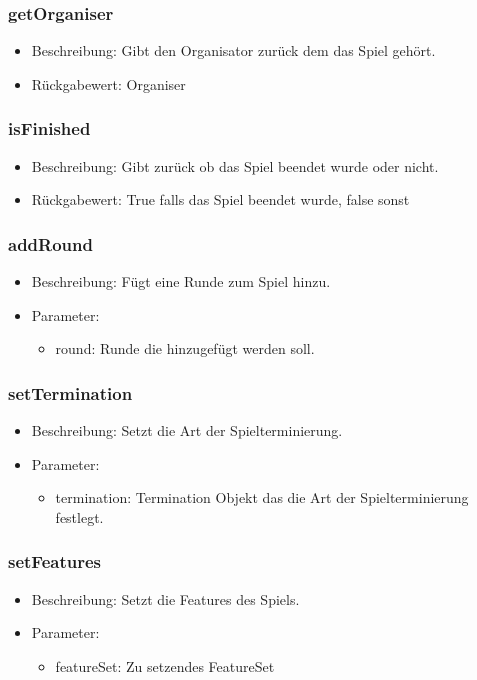 \documentclass[a4paper]{scrreprt}
\begin{document}
	\subsubsection{getOrganiser}
	\begin{itemize}
		\item Beschreibung: Gibt den Organisator zurück dem das Spiel gehört.
		\item Rückgabewert: Organiser
	\end{itemize}

	\subsubsection{isFinished}
	\begin{itemize}
		\item Beschreibung: Gibt zurück ob das Spiel beendet wurde oder nicht.
		\item Rückgabewert: True falls das Spiel beendet wurde, false sonst
	\end{itemize}

	\subsubsection{addRound}
	\begin{itemize}
		\item Beschreibung: Fügt eine Runde zum Spiel hinzu.
		\item Parameter:
		\begin{itemize}
			\item round: Runde die hinzugefügt werden soll.
		\end{itemize}
	\end{itemize}

	\subsubsection{setTermination}
	\begin{itemize}
		\item Beschreibung: Setzt die Art der Spielterminierung.
		\item Parameter:
		\begin{itemize}
			\item termination: Termination Objekt das die Art der Spielterminierung festlegt.
		\end{itemize}
	\end{itemize}

	\subsubsection{setFeatures}
	\begin{itemize}
		\item Beschreibung: Setzt die Features des Spiels.
		\item Parameter:
		\begin{itemize}
			\item featureSet: Zu setzendes FeatureSet
		\end{itemize}
	\end{itemize}
\end{document}
